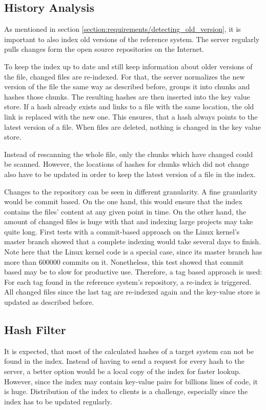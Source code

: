 \subsection{History Analysis}\label{section:implementation/creating_index/history_analysis}
As mentioned in section \ref{section:requirements/detecting_old_version}, it is important to also index old versions of the reference system.
The server regularly pulls changes form the open source repositories on the Internet.

To keep the index up to date and still keep information about older versions of the file, changed files are re-indexed.
For that, the server normalizes the new version of the file the same way as described before, groups it into chunks and hashes those chunks.
The resulting hashes are then inserted into the key value store.
If a hash already exists and links to a file with the same location, the old link is replaced with the new one.
This ensures, that a hash always points to the latest version of a file.
When files are deleted, nothing is changed in the key value store.

Instead of rescanning the whole file, only the chunks which have changed could be scanned.
However, the locations of hashes for chunks which did not change also have to be updated  in order to keep the latest version of a file in the index.

Changes to the repository can be seen in different granularity.
A fine granularity would be commit based.
On the one hand, this would ensure that the index contains the files' content at any given point in time.
On the other hand, the amount of changed files is huge with that and indexing large projects may take quite long.
First tests with a commit-based approach on the Linux kernel's master branch showed that a complete indexing would take several days to finish.
Note here that the Linux kernel code is a special case, since its master branch has more than 600000 commits on it.
Nonetheless, this test showed that commit based may be to slow for productive use.
Therefore, a tag based approach is used:
For each tag found in the reference system's repository, a re-index is triggered.
All changed files since the last tag are re-indexed again and the key-value store is updated as described before.

\subsection{Hash Filter}\label{section:implementation/creating_index/hash_filter}
It is expected, that most of the calculated hashes of a target system can not be found in the index.
Instead of having to send a request for every hash to the server, a better option would be a local copy of the index for faster lookup.
However, since the index may contain key-value pairs for billions lines of code, it is huge.
Distribution of the index to clients is a challenge, especially since the index has to be updated regularly.

